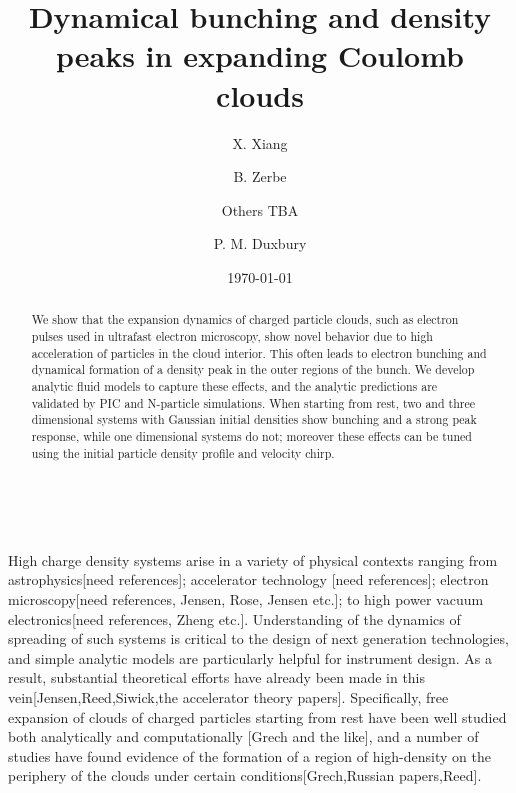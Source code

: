 \documentclass[aps,prl,twocolumn,showpacs,superscriptaddress,groupedaddress]{revtex4-1}  %
\begin{document}
\title{Dynamical bunching and density peaks in expanding Coulomb clouds}
\author{X. Xiang}\email{}
\author{B. Zerbe}
\author{Others TBA}
\author{P. M. Duxbury}


\date{\today}

\newcommand{\vect}[1]{\boldsymbol{#1}}​


\begin{abstract}
We show that the expansion dynamics of charged particle clouds, such as electron pulses used 
in ultrafast electron microscopy, show novel behavior due to high acceleration of 
particles in the cloud interior.    This often leads to electron bunching and dynamical  formation of a density peak 
in the outer regions of the bunch.     We develop analytic fluid models 
to capture these effects, and the analytic predictions are validated by PIC and N-particle simulations.   
When starting from rest, two and three dimensional 
systems with Gaussian initial densities show bunching and a strong peak response, 
while one dimensional systems do not; moreover these effects can be 
tuned using the initial particle density profile and velocity chirp.  

\end{abstract}

\maketitle

High charge density systems arise in a variety of physical contexts ranging 
from astrophysics[need references];  accelerator technology [need references]; 
electron microscopy[need references, Jensen, Rose, Jensen etc.]; to 
high power vacuum electronics[need references, Zheng etc.].  Understanding of  
the dynamics of spreading of such systems is critical to the design of next generation 
technologies, and simple analytic models are particularly helpful 
for instrument design.  As a result, substantial theoretical efforts have already
been made in this vein[Jensen,Reed,Siwick,the accelerator theory papers].  Specifically, 
free expansion of 
clouds of charged particles starting from rest
have been well studied both analytically and computationally [Grech and the like], and
a number of studies have found evidence of the formation of a region of high-density on the periphery
of the clouds under certain conditions[Grech,Russian papers,Reed].
\end{document}

